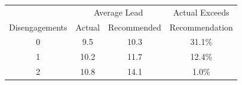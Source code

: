 \begin{tabular}{c|cc|c}
 & \multicolumn{2}{c|}{Average Lead} & Actual Exceeds \\
Disengagements & Actual & Recommended & Recommendation \\
  \hline
0 & 9.5 & 10.3 & 31.1\% \\ 
  1 & 10.2 & 11.7 & 12.4\% \\ 
  2 & 10.8 & 14.1 & 1.0\% \\ 
\end{tabular}
